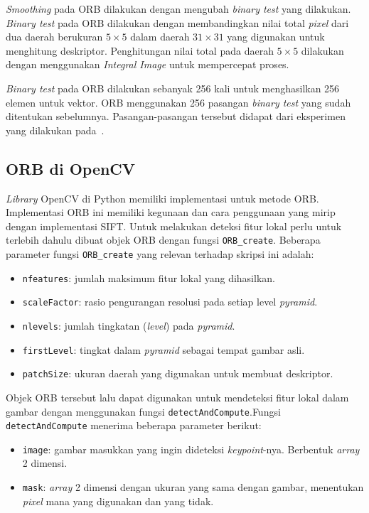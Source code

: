 \textit{Smoothing} pada ORB dilakukan dengan mengubah \textit{binary test} yang dilakukan. \textit{Binary test} pada ORB dilakukan dengan membandingkan nilai total \textit{pixel} dari dua daerah berukuran $5\times5$ dalam daerah $31\times31$ yang digunakan untuk menghitung deskriptor. Penghitungan nilai total pada daerah $5\times5$ dilakukan dengan menggunakan \textit{Integral Image} untuk mempercepat proses. 

\textit{Binary test} pada ORB dilakukan sebanyak 256 kali untuk menghasilkan 256 elemen untuk vektor. ORB menggunakan 256 pasangan \textit{binary test} yang sudah ditentukan sebelumnya. Pasangan-pasangan tersebut didapat dari eksperimen yang dilakukan pada~\cite{rublee2011orb}.

\subsection{ORB di OpenCV}
\textit{Library} OpenCV di Python memiliki implementasi untuk metode ORB. Implementasi ORB ini memiliki kegunaan dan cara penggunaan yang mirip dengan implementasi SIFT. Untuk melakukan deteksi fitur lokal perlu untuk terlebih dahulu dibuat objek ORB dengan fungsi \texttt{ORB\_create}. Beberapa parameter fungsi \texttt{ORB\_create} yang relevan terhadap skripsi ini adalah:
\begin{itemize}
	\item \texttt{nfeatures}: jumlah maksimum fitur lokal yang dihasilkan.
	\item \texttt{scaleFactor}: rasio pengurangan resolusi pada setiap level \textit{pyramid}.
	\item \texttt{nlevels}: jumlah tingkatan (\textit{level}) pada \textit{pyramid}.
	\item \texttt{firstLevel}: tingkat dalam \textit{pyramid} sebagai tempat gambar asli.
	\item \texttt{patchSize}: ukuran daerah yang digunakan untuk membuat deskriptor.
\end{itemize}

Objek ORB tersebut lalu dapat digunakan untuk mendeteksi fitur lokal dalam gambar dengan menggunakan fungsi \texttt{detectAndCompute}.Fungsi \texttt{detectAndCompute} menerima beberapa parameter berikut:
\begin{itemize}
	\item \texttt{image}: gambar masukkan yang ingin dideteksi \textit{keypoint}-nya. Berbentuk \textit{array} 2 dimensi.
	\item \texttt{mask}: \textit{array} 2 dimensi dengan ukuran yang sama dengan gambar, menentukan \textit{pixel} mana yang digunakan dan yang tidak.
\end{itemize}

